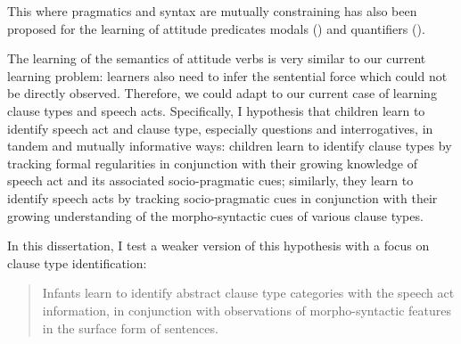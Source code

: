 This \hypos{} where pragmatics and syntax are mutually constraining has also been proposed for the learning of attitude predicates modals (\citealt{dieuleveut2021}) and quantifiers (\citealt{knowlton2021}). 

The learning of the semantics of attitude verbs is very similar to our current learning problem: learners also need to infer the sentential force which could not be directly observed. %
Therefore, we could adapt to our current case of learning clause types and speech acts. Specifically, I hypothesis that children learn to identify speech act and clause type, especially questions and interrogatives, in tandem and mutually informative ways: children learn to identify clause types by tracking formal regularities in conjunction with their growing knowledge of speech act and its associated socio-pragmatic cues; similarly, they learn to identify speech acts by tracking socio-pragmatic cues in conjunction with their growing understanding of the morpho-syntactic cues of various clause types.


In this dissertation, I test a weaker version of this hypothesis with a focus on clause type identification:

\begin{quote}
Infants learn to identify abstract clause type categories with the speech act information, in conjunction with observations of morpho-syntactic features in the surface form of sentences.
\end{quote}

